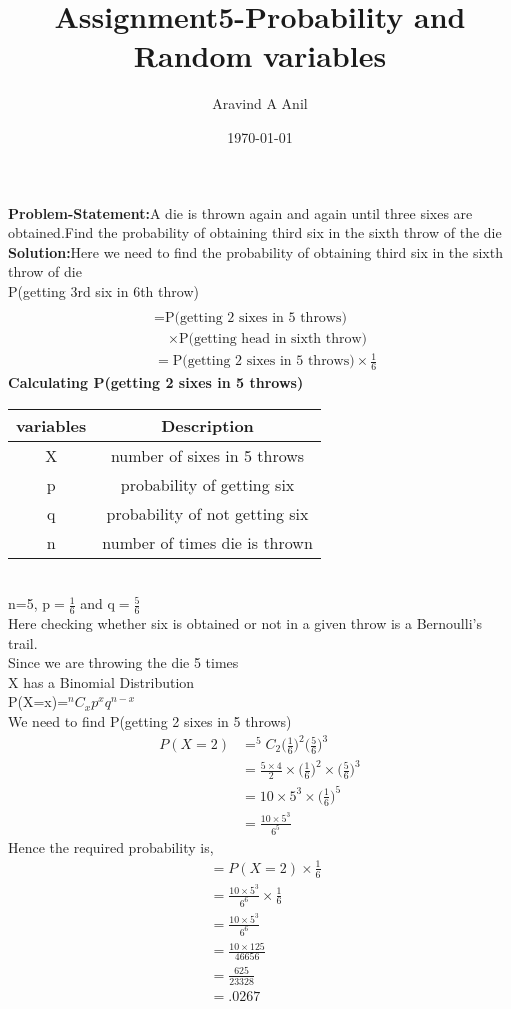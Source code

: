 \documentclass[11pt,a4paper,twocolumn]{article}
\title{Assignment5-Probability and Random variables}
\author{Aravind A Anil}
\date{\today}
\begin{document}
\maketitle

\textbf{Problem-Statement:}A die is thrown again and again until three sixes are obtained.Find the probability of obtaining third six in the sixth throw of the die
\\\textbf{Solution:}Here we need to find the probability of obtaining third six in the sixth throw of die
\\P(getting 3rd six in 6th throw)
\begin{align*}
\\&=\text{P(getting 2 sixes in 5 throws)}\\
&\quad\times\text{P(getting head in sixth throw)}
\\&=\text{P(getting 2 sixes in 5 throws)}\times \frac{1}{6}
\end{align*}
\textbf{Calculating P(getting 2 sixes in 5 throws)}
\begin{table}[h!]
    \centering
    \begin{tabular}{|c|c|}
    \hline
        variables & Description\\
        \hline
        X& number of sixes in 5 throws\\
        \hline
        p&probability of getting six\\
        \hline
        q&probability of not getting six\\
        \hline
        n&number of times die is thrown\\
        \hline
        \end{tabular}
        \label{tab:my_label}
\end{table}
\\n=5, $\text{p}=\frac{1}{6}$ and $\text{q}=\frac{5}{6}$
\\Here checking whether six is obtained or not in a given throw is a 
Bernoulli's trail.
\\Since we are throwing the die 5 times 
\\X has a Binomial Distribution
\\P(X=x)=$^{n}C_xp^{x}q^{n-x}$
\\We need to find P(getting 2 sixes in 5 throws)
\begin{align*}
    P(X=2)&=^{5}C_2\Big(\frac{1}{6}\Big)^{2}\Big(\frac{5}{6}\Big)^{3}\\&=\frac{5\times4}{2}\times\Big(\frac{1}{6}\Big)^{2}\times\Big(\frac{5}{6}\Big)^{3}
    \\&=10\times5^3\times\Big(\frac{1}{6}\Big)^{5}\\
    &=\frac{10\times5^{3}}{6^{5}}
\end{align*}
Hence the required probability is,
\begin{align*}
    &=P(X=2)\times\frac{1}{6}\\
    &=\frac{10\times5^{3}}{6^{6}}\times\frac{1}{6}\\
    &=\frac{10\times5^{3}}{6^{6}}\\
    &=\frac{10\times125}{46656}\\
    &=\frac{625}{23328}\\
    &=.0267
\end{align*}
\end{document}
